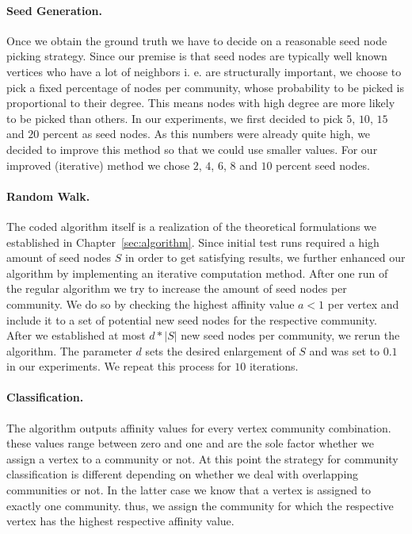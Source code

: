 \paragraph{Seed Generation.}
Once we obtain the ground truth we have to decide on a reasonable seed node 
picking strategy. Since our premise is that seed nodes are typically well known vertices who have a lot of neighbors i. e. are structurally important, we choose to pick a fixed percentage of nodes per community, whose probability to be picked is proportional to their degree. This means nodes with high degree are more likely to be picked than others. In our experiments, we first decided to pick $5$, $10$, $15$ and $20$ percent as seed nodes. As this numbers were already quite high, we decided to improve this method so that we could use smaller values. For our improved (iterative) method we chose $2$, $4$, $6$, $8$ and $10$ percent seed nodes.

\paragraph{Random Walk.}
The coded algorithm itself is a realization of the theoretical formulations we 
established in Chapter~\ref{sec:algorithm}. Since initial test runs required a high amount of seed nodes $S$ in order to get satisfying results, we further enhanced our algorithm by implementing an iterative computation method. After one run of the regular algorithm we try to increase the amount of seed nodes per community. We do so by checking the highest affinity value $a < 1$ per vertex and include it to a set of potential new seed nodes for the respective community. After we established at most $d * \left| S \right|$ new seed nodes per community, we rerun the algorithm. The parameter $d$ sets the desired enlargement of $S$ and was set to $0.1$ in our experiments. We repeat this process for $10$ iterations.

\paragraph{Classification.}
The algorithm outputs affinity values for every vertex community combination. 
these values range between zero and one and are the sole factor whether we 
assign a vertex to a community or not. At this point the strategy for community classification is different depending on whether we deal with overlapping communities or not. In the latter case we know that a vertex is assigned to exactly one community. thus, we assign the community for which the respective vertex has the highest respective affinity value. 

